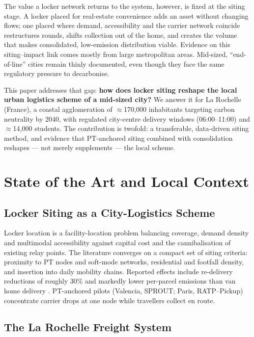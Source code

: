\documentclass[10pt,a4paper,twocolumn]{article}
\begin{document}
The value a locker network returns to the system, however, is fixed at the siting
stage. A locker placed for real-estate convenience adds an asset without changing
flows; one placed where demand, accessibility and the carrier network coincide
restructures rounds, shifts collection out of the home, and creates the volume
that makes consolidated, low-emission distribution viable. Evidence on this
siting--impact link comes mostly from large metropolitan areas. Mid-sized,
``end-of-line'' cities remain thinly documented, even though they face the same
regulatory pressure to decarbonise.

This paper addresses that gap: \textbf{how does locker siting reshape the local
urban logistics scheme of a mid-sized city?} We answer it for La Rochelle (France),
a coastal agglomeration of $\approx$170,000 inhabitants targeting carbon neutrality
by 2040, with regulated city-centre delivery windows (06:00--11:00) and
$\approx$14,000 students. The contribution is twofold: a transferable, data-driven
siting method, and evidence that PT-anchored siting combined with consolidation
reshapes --- not merely supplements --- the local scheme.

\section{State of the Art and Local Context}

\subsection{Locker Siting as a City-Logistics Scheme}

Locker location is a facility-location problem balancing coverage, demand density
and multimodal accessibility against capital cost and the cannibalisation of
existing relay points. The literature converges on a compact set of siting criteria:
proximity to PT nodes and soft-mode networks, residential and footfall density, and
insertion into daily mobility chains. Reported effects include re-delivery reductions
of roughly 30\% and markedly lower per-parcel emissions than van home delivery
\citep{iwan2016,deutsch2018,lachapelle2018}. PT-anchored pilots (Valencia, SPROUT;
Paris, RATP--Pickup) concentrate carrier drops at one node while travellers collect
en route.

\subsection{The La Rochelle Freight System}
\end{document}
